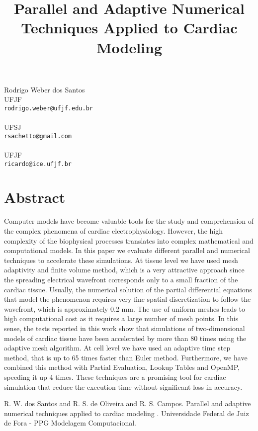 \title{Parallel and Adaptive Numerical Techniques Applied to Cardiac Modeling }
\author{}  \institute{}
\maketitle
\begin{center}
{\large Rodrigo Weber  dos Santos}\\
UFJF\\
{\tt rodrigo.weber@ufjf.edu.br}
\\ \vspace{4mm}{\large Rafael Sachetto de Oliveira}\\
UFSJ\\
{\tt rsachetto@gmail.com}
\\ \vspace{4mm}{\large Ricardo Silva Campos}\\
UFJF\\
{\tt ricardo@ice.ufjf.br}

\end{center}

\section*{Abstract}

Computer models have become valuable tools for the study and comprehension of the complex phenomena of cardiac electrophysiology. However, the high complexity of the biophysical processes translates into complex mathematical and computational models. 
In this paper we evaluate different parallel and numerical techniques to accelerate these simulations. 
At tissue level we have used mesh adaptivity and finite volume method, which is a very attractive approach since the spreading electrical wavefront corresponds only to a small fraction of the cardiac tissue. Usually, the numerical solution of the partial differential equations that model the phenomenon requires very fine spatial discretization to follow the wavefront, which is approximately 0.2 mm. The use of uniform meshes leads to high computational cost as it requires a large number of mesh points. In this sense, the tests reported in this work show that simulations of two-dimensional models of cardiac tissue have been accelerated by more than 80 times using the adaptive mesh algorithm. At cell level we have used an adaptive time step method, that is up to 65 times faster than Euler method. Furthermore, we have combined this method with Partial Evaluation,  Lookup Tables and OpenMP, speeding it up 4 times. These techniques are a promising tool for cardiac simulation that reduce the execution time without significant loss in accuracy. 




\begin{thebibliography}{10}

{\sc R. W. dos Santos and R. S. de Oliveira and R. S. Campos}. {Parallel and adaptive numerical techniques applied to cardiac modeling }. Universidade Federal de Juiz de Fora - PPG Modelagem Computacional.

\end{thebibliography}

